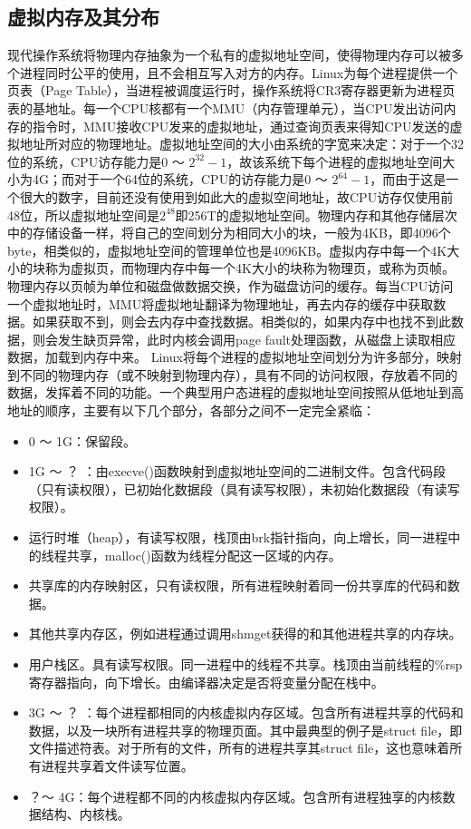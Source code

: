 \subsection{虚拟内存及其分布}
现代操作系统将物理内存抽象为一个私有的虚拟地址空间，使得物理内存可以被多个进程同时公平的使用，且不会相互写入对方的内存。Linux为每个进程提供一个页表（Page Table），当进程被调度运行时，操作系统将CR3寄存器更新为进程页表的基地址。每一个CPU核都有一个MMU（内存管理单元），当CPU发出访问内存的指令时，MMU接收CPU发来的虚拟地址，通过查询页表来得知CPU发送的虚拟地址所对应的物理地址。虚拟地址空间的大小由系统的字宽来决定：对于一个32位的系统，CPU访存能力是0 ～ $2^{32}-1$，故该系统下每个进程的虚拟地址空间大小为4G；而对于一个64位的系统，CPU的访存能力是0 ～ $2^{64}-1$，而由于这是一个很大的数字，目前还没有使用到如此大的虚拟空间地址，故CPU访存仅使用前48位，所以虚拟地址空间是$2^{48}$即256T的虚拟地址空间。物理内存和其他存储层次中的存储设备一样，将自己的空间划分为相同大小的块，一般为4KB，即4096个byte，相类似的，虚拟地址空间的管理单位也是4096KB。虚拟内存中每一个4K大小的块称为虚拟页，而物理内存中每一个4K大小的块称为物理页，或称为页帧。物理内存以页帧为单位和磁盘做数据交换，作为磁盘访问的缓存。每当CPU访问一个虚拟地址时，MMU将虚拟地址翻译为物理地址，再去内存的缓存中获取数据。如果获取不到，则会去内存中查找数据。相类似的，如果内存中也找不到此数据，则会发生缺页异常，此时内核会调用page fault处理函数，从磁盘上读取相应数据，加载到内存中来。
\label{chap:mem}
Linux将每个进程的虚拟地址空间划分为许多部分，映射到不同的物理内存（或不映射到物理内存），具有不同的访问权限，存放着不同的数据，发挥着不同的功能。一个典型用户态进程的虚拟地址空间按照从低地址到高地址的顺序，主要有以下几个部分，各部分之间不一定完全紧临：
\begin{itemize}
  \item 0 ～ 1G：保留段。
  \item 1G ～ ？ ：由execve()函数映射到虚拟地址空间的二进制文件。包含代码段（只有读权限），已初始化数据段（具有读写权限），未初始化数据段（有读写权限）。
  \item 运行时堆（heap），有读写权限，栈顶由brk指针指向，向上增长，同一进程中的线程共享，malloc()函数为线程分配这一区域的内存。
  \item 共享库的内存映射区，只有读权限，所有进程映射着同一份共享库的代码和数据。
  \item 其他共享内存区，例如进程通过调用shmget获得的和其他进程共享的内存块。
  \item 用户栈区。具有读写权限。同一进程中的线程不共享。栈顶由当前线程的\%rsp寄存器指向，向下增长。由编译器决定是否将变量分配在栈中。
  \item 3G ～ ？ ：每个进程都相同的内核虚拟内存区域。包含所有进程共享的代码和数据，以及一块所有进程共享的物理页面。其中最典型的例子是struct file，即文件描述符表。对于所有的文件，所有的进程共享其struct file，这也意味着所有进程共享着文件读写位置。
  \item ？～ 4G：每个进程都不同的内核虚拟内存区域。包含所有进程独享的内核数据结构、内核栈。
\end{itemize}
